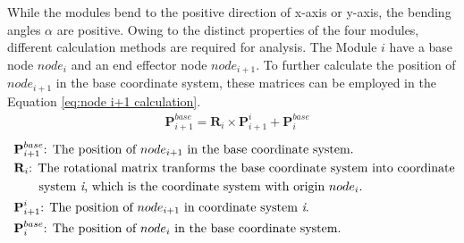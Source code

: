 \noindent While the modules bend to the positive direction of x-axis or y-axis, the bending angles $\alpha$ are 
positive. Owing to the distinct properties of the four modules, different calculation methods are required for analysis. 
The Module $i$ have a base node $node_i$ and an end effector node $node_{i+1}$. To further calculate the position of 
$node_{i+1}$ in the base coordinate system, these matrices can be employed in the Equation \ref{eq:node i+1 calculation}.
\begin{align}
    &\textbf{P}_{i+1}^{base} = \textbf{R}_{i} \times \textbf{P}_{i+1}^{i} + \textbf{P}_{i}^{base}
    \label{eq:node i+1 calculation}
\end{align}
\begin{align*}
    &\ \textbf{P}_{i+1}^{base}\text{: The position of $node_{i+1}$ in the base coordinate system.}\\
    &\ \textbf{R}_{i}\text{: The rotational matrix tranforms the base coordinate system into coordinate}\\
    &\ \qquad\text{system \textit{i}, which is the coordinate system with origin $node_i$.}\\
    &\ \textbf{P}_{i+1}^{i}\text{: The position of $node_{i+1}$ in coordinate system \textit{i}.}\\
    &\ \textbf{P}_{i}^{base}\text{: The position of $node_{i}$ in the base coordinate system.}
\end{align*}
